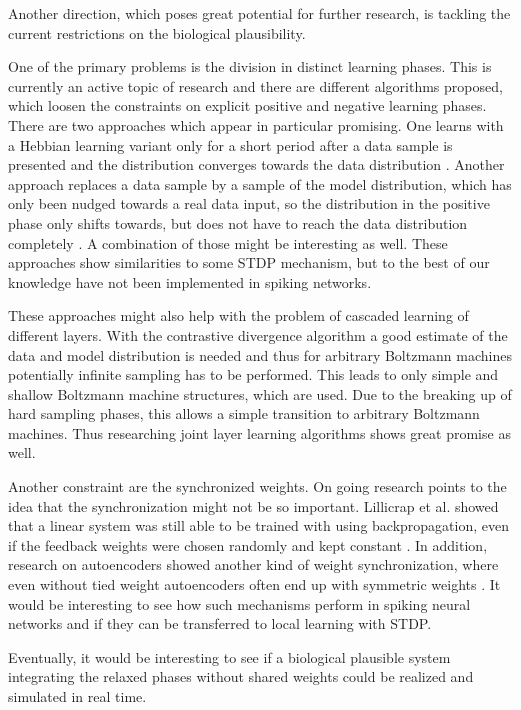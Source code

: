 Another direction, which poses great potential for further research, is tackling the current restrictions on the biological plausibility.  

One of the primary problems is the division in distinct learning phases.
This is currently an active topic of research and there are different algorithms proposed, which loosen the constraints on explicit positive and negative learning phases.
There are two approaches which appear in particular promising.
One learns with a Hebbian learning variant only for a short period after a data sample is presented and the distribution converges towards the data distribution \cite{DBLP:journals/corr/ScellierB16}.
Another approach replaces a data sample by a sample of the model distribution, which has only been nudged towards a real data input, so the distribution in the positive phase only shifts towards, but does not have to reach the data distribution completely \cite{Scellier2016a}.
A combination of those might be interesting as well.
These approaches show similarities to some STDP mechanism, but to the best of our knowledge have not been implemented in spiking networks.

These approaches might also help with the problem of cascaded learning of different layers.
With the contrastive divergence algorithm a good estimate of the data and model distribution is needed and thus for arbitrary Boltzmann machines potentially infinite sampling has to be performed.
This leads to only simple and shallow Boltzmann machine structures, which are used.
Due to the breaking up of hard sampling phases, this allows a simple transition to arbitrary Boltzmann machines.
Thus researching joint layer learning algorithms shows great promise as well.

Another constraint are the synchronized weights.
On going research points to the idea that the synchronization might not be so important.
Lillicrap et al. showed that a linear system was still able to be trained with using backpropagation, even if the feedback weights were chosen randomly and kept constant \cite{Lillicrap2014}.
In addition, research on autoencoders showed another kind of weight synchronization, where even without tied weight autoencoders often end up with symmetric weights \cite{vincent2010stacked}.
It would be interesting to see how such mechanisms perform in spiking neural networks and if they can be transferred to local learning with STDP.

Eventually, it would be interesting to see if a biological plausible system integrating the relaxed phases without shared weights could be realized and simulated in real time.
 